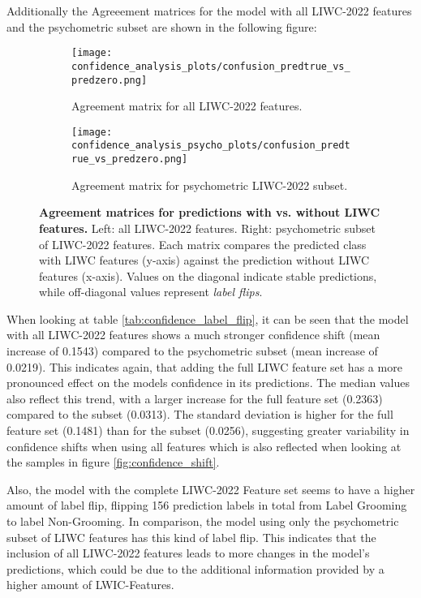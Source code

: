 Additionally the Agreeement matrices for the model with all LIWC-2022 features and the psychometric subset are shown in the following figure: 
\begin{figure}[H]
  \centering

  \begin{subfigure}[t]{0.49\textwidth}
    \centering
    \texttt{[image: confidence\_analysis\_plots/confusion\_predtrue\_vs\_predzero.png]}
    \caption{Agreement matrix for all LIWC-2022 features.}
    \label{fig:agreement_all}
  \end{subfigure}\hfill
  \begin{subfigure}[t]{0.49\textwidth}
    \centering
    \texttt{[image: confidence\_analysis\_psycho\_plots/confusion\_predtrue\_vs\_predzero.png]}
    \caption{Agreement matrix for psychometric LIWC-2022 subset.}
    \label{fig:agreement_psycho}
  \end{subfigure}

  \caption[Agreement matrices for predictions with vs. without LIWC features.]{\textbf{Agreement matrices for predictions with vs. without LIWC features.} 
  Left: all LIWC-2022 features. Right: psychometric subset of LIWC-2022 features. 
  Each matrix compares the predicted class with LIWC features (y-axis) against the prediction without LIWC features (x-axis). 
  Values on the diagonal indicate stable predictions, while off-diagonal values represent \emph{label flips}.}
  \label{fig:agreement_combined}
\end{figure}

When looking at table \ref{tab:confidence_label_flip}, it can be seen that the model with all LIWC-2022 features shows a much stronger confidence shift (mean increase of 0.1543) compared to the psychometric subset (mean increase of 0.0219). This indicates again, that adding the full LIWC feature set has a more pronounced effect on the models confidence in its predictions. The median values also reflect this trend, with a larger increase for the full feature set (0.2363) compared to the subset (0.0313). The standard deviation is higher for the full feature set (0.1481) than for the subset (0.0256), suggesting greater variability in confidence shifts when using all features which is also reflected when looking at the samples in figure \ref{fig:confidence_shift}. 

Also, the model with the complete LIWC-2022 Feature set seems to have a higher amount of label flip, flipping 156 prediction labels in total from Label Grooming to label Non-Grooming. In comparison, the model using only the psychometric subset of LIWC features has this kind of label flip. This indicates that the inclusion of all LIWC-2022 features leads to more changes in the model's predictions, which could be due to the additional information provided by a higher amount of LWIC-Features.

